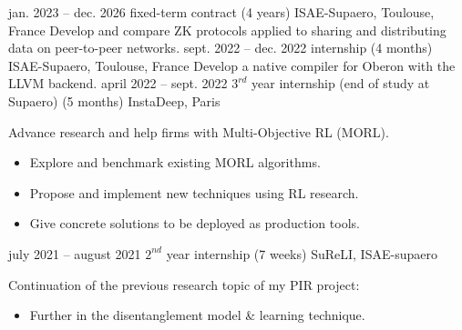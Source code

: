\documentclass[
	a4paper,
]{fortysecondscv}
\begin{document}
\makefrontsidebar
{}

\begin{cvtable}[4]
	\cvitem
    	{jan. 2023 -- dec. 2026}
    	{fixed-term contract \newline (4 years)}
    	{ISAE-Supaero, Toulouse, France}
    	{
			Develop and compare ZK protocols applied to sharing and distributing data on peer-to-peer networks.
    	}
	\cvitem
    	{sept. 2022 -- dec. 2022}
    	{internship \newline (4 months)}
    	{ISAE-Supaero, Toulouse, France}
    	{
			Develop a native compiler for Oberon with the LLVM backend.
    	}
	\cvitem
    	{april 2022 -- sept. 2022}
    	{$3^{rd}$ year internship (end of study at Supaero) \newline (5 months)}
    	{InstaDeep, Paris}
    	{
    	    Advance research and help firms with Multi-Objective RL (MORL).
        	\begin{itemize}
        	    \item Explore and benchmark existing MORL algorithms.
        	    \item Propose and implement new techniques using RL research.
        	    \item Give concrete solutions to be deployed as production tools.
        	\end{itemize}
    	}
	\cvitem
    	{july 2021 -- august 2021}
    	{$2^{nd}$ year internship \newline (7 weeks)}
    	{SuReLI, ISAE-supaero}
    	{
        	Continuation of the previous research topic of my PIR project:
        	\begin{itemize}
        	    \item Further in the disentanglement model \& learning technique.
        	\end{itemize}
}
\end{cvtable}
\end{document}
